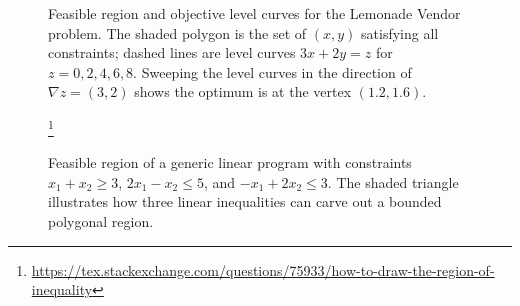 \begin{solution}
\begin{figure}[H]
\caption{Feasible region and objective level curves for the Lemonade Vendor problem. The shaded polygon is the set of $(x,y)$ satisfying all constraints; dashed lines are level curves $3x+2y = z$ for $z = 0,2,4,6,8$. Sweeping the level curves in the direction of $\nabla z = (3,2)$ shows the optimum is at the vertex $(1.2,1.6)$.}
\label{fig:LemonadeVendorFeasibleRegion}
\end{figure}

\begin{figure}[H]
\centering
{}\footnote{%
\url{https://tex.stackexchange.com/questions/75933/how-to-draw-the-region-of-inequality}%
}
\caption{Feasible region of a generic linear program with constraints $x_1+x_2\geq 3$, $2x_1-x_2\leq 5$, and $-x_1+2x_2\leq 3$. The shaded triangle illustrates how three linear inequalities can carve out a bounded polygonal region.}
\label{fig:GenericThreeConstraintRegion}
\end{figure}
%


\end{solution}

